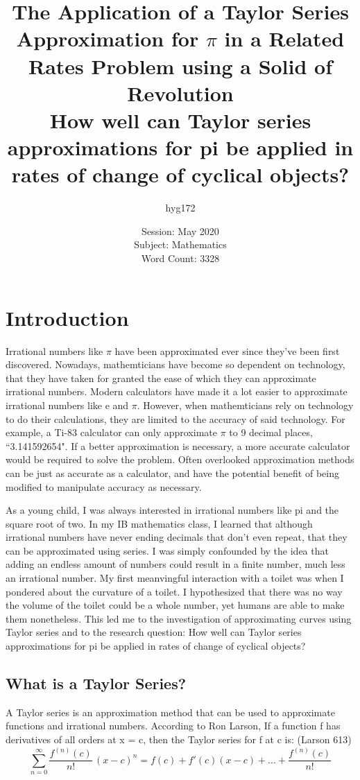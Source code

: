 \documentclass[12pt, titlepage]{article}
\author{hyg172}
\date{Session: May 2020 \\ Subject: Mathematics \\ Word Count: 3328}
\title{The Application of a Taylor Series Approximation for \(\pi\) in a Related Rates Problem using a Solid of Revolution \bigskip \\  How well can Taylor series approximations for pi be applied in rates of change of cyclical objects?}
\begin{document}
\maketitle
\tableofcontents
\newpage

\section{Introduction}
Irrational numbers like \(\pi\) have been approximated ever since they've been first discovered. Nowadays, mathemticians have become so dependent on technology, that they have taken for granted the ease of which they can approximate irrational numbers. Modern calculators have made it a lot easier to approximate irrational numbers like e and \(\pi\). However, when mathemticians rely on technology to do their calculations, they are limited to the accuracy of said technology. For example, a Ti-83 calculator can only approximate \(\pi\) to 9 decimal places, ``3.141592654". If a better approximation is necessary, a more accurate calculator would be required to solve the problem. Often overlooked approximation methods can be just as accurate as a calculator, and have the potential benefit of being modified to manipulate accuracy as necessary.

As a young child, I was always interested in irrational numbers like pi and the square root of two. In my IB mathematics class, I learned that although irrational numbers have never ending decimals that don't even repeat, that they can be approximated using series. I was simply confounded by the idea that adding an endless amount of numbers could result in a finite number, much less an irrational number. My first meanvingful interaction with a toilet was when I pondered about the curvature of a toilet. I hypothesized that there was no way the volume of the toilet could be a whole number, yet humans are able to make them nonetheless. This led me to the investigation of approximating curves using Taylor series and to the research question: How well can Taylor series approximations for pi be applied in rates of change of cyclical objects?

\subsection{What is a Taylor Series?}
A Taylor series is an approximation method that can be used to approximate functions and irrational numbers. According to Ron Larson, If a function f has derivatives of all orders at x = c, then the Taylor series for f at c is: (Larson 613)
\begin{equation}
  \sum_{n=0}^{\infty} \frac{f^{(n)}(c)}{n!} \, (x-c)^{n} = f(c) + f'(c)(x-c) + ... +  \frac{f^{(n)}(c)}{n!}
\end{equation}
\end{document}
